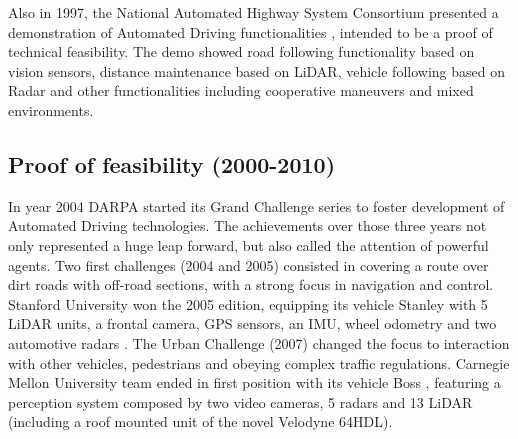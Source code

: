 Also in 1997, the National Automated Highway System Consortium presented a 
demonstration of Automated Driving functionalities \cite{Thorpe1997}, intended 
to be a proof of technical feasibility. 
The demo showed road following functionality based on vision sensors, distance 
maintenance based on LiDAR, vehicle following based on Radar and other 
functionalities including cooperative maneuvers and mixed environments.



\subsection{Proof of feasibility (2000-2010)}

In year 2004 DARPA started its Grand Challenge series to foster development of
Automated Driving technologies. The achievements over those three years 
not only represented a huge leap forward, but also called the attention of
powerful agents.
Two first challenges (2004 and 2005) consisted in covering a route over dirt
roads with off-road sections, with a strong focus in navigation and control.
Stanford University won the 2005 edition, equipping its vehicle Stanley with
5 LiDAR units, a frontal camera, GPS sensors, an IMU, wheel odometry and two 
automotive radars \cite{Thrun2006}. 
The Urban Challenge (2007) changed the focus to interaction with other vehicles,
pedestrians and obeying complex traffic regulations. Carnegie Mellon University
team ended in first position with its vehicle Boss 
\cite{TartanRacing2005, Urmson2007}, 
featuring a perception system composed by two video cameras, 5 radars and 13
LiDAR (including a roof mounted unit of the novel Velodyne 64HDL).


